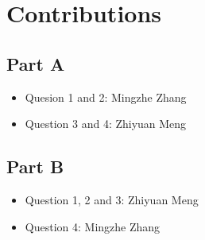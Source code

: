 \documentclass{article}
\begin{document}
\section*{Contributions}

\subsection*{Part A}

\begin{itemize}
    \item Quesion 1 and 2: Mingzhe Zhang
    
    \item Question 3 and 4: Zhiyuan Meng
\end{itemize}

\subsection*{Part B}

\begin{itemize}
    \item Question 1, 2 and 3: Zhiyuan Meng
    
    \item Question 4: Mingzhe Zhang
\end{itemize}
\end{document}
